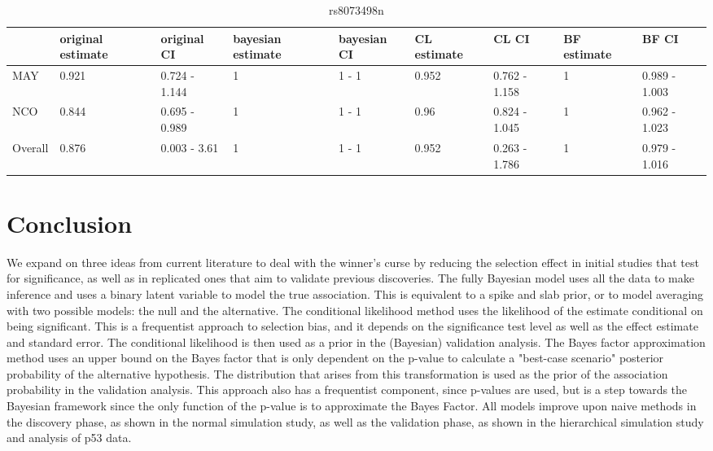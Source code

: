 \documentclass[AMA,STIX1COL]{WileyNJD-v2}\usepackage[]{graphicx}\usepackage[]{color}
\begin{document}
\begin{table}

\caption{\label{tab:unnamed-chunk-39}rs8073498n}
\centering
\begin{tabular}[t]{l|l|l|l|l|l|l|l|l}
\hline
  & original estimate & original CI & bayesian estimate & bayesian CI & CL estimate & CL CI & BF estimate & BF CI\\
\hline
MAY & 0.921 & 0.724 - 1.144 & 1 & 1 - 1 & 0.952 & 0.762 - 1.158 & 1 & 0.989 - 1.003\\
\hline
NCO & 0.844 & 0.695 - 0.989 & 1 & 1 - 1 & 0.96 & 0.824 - 1.045 & 1 & 0.962 - 1.023\\
\hline
Overall & 0.876 & 0.003 - 3.61 & 1 & 1 - 1 & 0.952 & 0.263 - 1.786 & 1 & 0.979 - 1.016\\
\hline
\end{tabular}
\end{table}


\section{Conclusion}\label{sec:conclusion}


We expand on three ideas from current literature to deal with the winner's curse by reducing the selection effect in initial studies that test for significance, as well as in replicated ones that aim to validate previous discoveries. The fully Bayesian model uses all the data to make inference and uses a binary latent variable to model the true association. This is equivalent to a spike and slab prior, or to model averaging with two possible models: the null and the alternative.  The conditional likelihood method uses the likelihood of the estimate conditional on being significant. This is a frequentist approach to selection bias, and it depends on the significance test level as well as the effect estimate and standard error. The conditional likelihood is then used as a prior in the (Bayesian) validation analysis. The Bayes factor approximation method uses an upper bound on the Bayes factor that is only dependent on the p-value to calculate a "best-case scenario" posterior probability of the alternative hypothesis. The distribution that arises from this transformation is used as the prior of the association probability in the validation analysis. This approach also has a frequentist component, since p-values are used, but is a step towards the Bayesian framework since the only function of the p-value is to approximate the Bayes Factor. All models improve upon naive methods in the discovery phase, as shown in the normal simulation study, as well as the validation phase, as shown in the hierarchical simulation study and analysis of p53 data.
\end{document}
